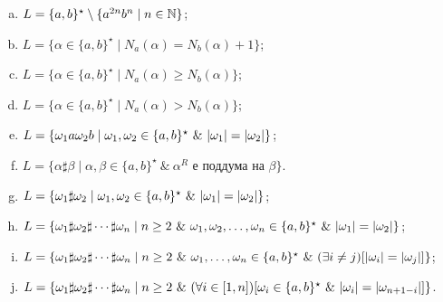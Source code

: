 \begin{problem}
\begin{enumerate}[a)]
  \item
    $L = \{a,b\}^\star \setminus \{a^{2n}b^n \mid n\in\mathbb{N}\}$;
  \item
    $L = \{\alpha \in \{a,b\}^\star\mid N_a(\alpha) = N_b(\alpha) + 1\}$;
  \item
    $L = \{\alpha \in \{a,b\}^\star\mid N_a(\alpha) \geq N_b(\alpha)\}$;
  \item
    $L = \{\alpha \in \{a,b\}^\star\mid N_a(\alpha) > N_b(\alpha)\}$;
  \item
    $L = \{\omega_1 a \omega_2 b \mid \omega_1,\omega_2 \in \{a,b\}^\star\ \&\ \lvert{\omega_1}\rvert = \lvert{\omega_2}\rvert\}$;
  \item
    $L = \{\alpha \sharp \beta \mid \alpha,\beta \in \{a,b\}^\star\ \&\ \alpha^R\mbox{ е поддума на }\beta \}$.
  \item 
    $L = \{\omega_1\sharp\omega_2 \mid \omega_1,\omega_2 \in \{a,b\}^\star\ \&\ \lvert{\omega_1}\rvert = \lvert{\omega_2}\rvert\}$;
  \item
    $L = \{\omega_1 \sharp \omega_2 \sharp \cdots \sharp \omega_n \mid n\geq 2\ \&\ \omega_1,\omega_2,\dots,\omega_n \in \{a,b\}^\star\ \&\ \abs{\omega_1} = \abs{\omega_2}\}$;
  \item
    $L = \{\omega_1 \sharp \omega_2 \sharp \cdots \sharp \omega_n \mid n\geq 2\ \&\ \omega_1,\dots,\omega_n \in \{a,b\}^\star\ \&\ (\exists i \neq j)[\lvert{\omega_i}\rvert = \lvert{\omega_j}\rvert]\}$;
  \item
    $L = \{\omega_1 \sharp \omega_2 \sharp \cdots \sharp \omega_n \mid n\geq 2\ \&\ (\forall i\in[1,n])[\omega_i \in \{a,b\}^\star\ \&\ \lvert{\omega_i}\rvert = \lvert{\omega_{n+1-i}}\rvert]\}$.
  \end{enumerate}
\end{problem}


